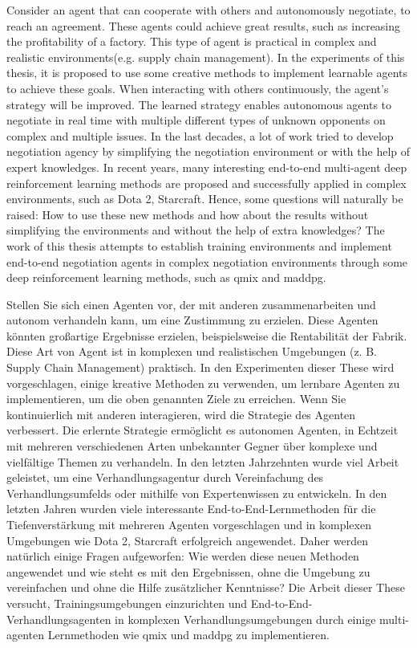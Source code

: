 
Consider an agent that can cooperate with others and autonomously negotiate, to reach an agreement. These agents could achieve great results, such as increasing the profitability of a factory. This type of agent is practical in complex and realistic environments(e.g. supply chain management). In the experiments of this thesis, it is proposed to use some creative methods to implement learnable agents to achieve these goals. When interacting with others continuously, the agent’s strategy will be improved. The learned strategy enables autonomous agents to negotiate in real time with multiple different types of unknown opponents on complex and multiple issues. In the last decades, a lot of work tried to develop negotiation agency by simplifying the negotiation environment or with the help of expert knowledges. In recent years, many interesting end-to-end multi-agent deep reinforcement learning methods are proposed and successfully applied in complex environments, such as Dota 2, Starcraft. Hence, some questions will naturally be raised: How to use these new methods and how about the results without simplifying the environments and without the help of extra knowledges? The work of this thesis attempts to establish training environments and implement end-to-end negotiation agents in complex negotiation environments through some deep reinforcement learning methods, such as \gls{qmix} and \gls{maddpg}.


Stellen Sie sich einen Agenten vor, der mit anderen zusammenarbeiten und autonom verhandeln kann, um eine Zustimmung zu erzielen. Diese Agenten könnten großartige Ergebnisse erzielen, beispielsweise die Rentabilität der Fabrik. Diese Art von Agent ist in komplexen und realistischen Umgebungen (z. B. Supply Chain Management) praktisch. In den Experimenten dieser These wird vorgeschlagen, einige kreative Methoden zu verwenden, um lernbare Agenten zu implementieren, um die oben genannten Ziele zu erreichen. Wenn Sie kontinuierlich mit anderen interagieren, wird die Strategie des Agenten verbessert. Die erlernte Strategie ermöglicht es autonomen Agenten, in Echtzeit mit mehreren verschiedenen Arten unbekannter Gegner über komplexe und vielfältige Themen zu verhandeln. In den letzten Jahrzehnten wurde viel Arbeit geleistet, um eine Verhandlungsagentur durch Vereinfachung des Verhandlungsumfelds oder mithilfe von Expertenwissen zu entwickeln. In den letzten Jahren wurden viele interessante End-to-End-Lernmethoden für die Tiefenverstärkung mit mehreren Agenten vorgeschlagen und in komplexen Umgebungen wie Dota 2, Starcraft erfolgreich angewendet. Daher werden natürlich einige Fragen aufgeworfen: Wie werden diese neuen Methoden angewendet und wie steht es mit den Ergebnissen, ohne die Umgebung zu vereinfachen und ohne die Hilfe zusätzlicher Kenntnisse? Die Arbeit dieser These versucht, Trainingsumgebungen einzurichten und End-to-End-Verhandlungsagenten in komplexen Verhandlungsumgebungen durch einige multi-agenten Lernmethoden wie \gls{qmix} und \gls{maddpg} zu implementieren.

